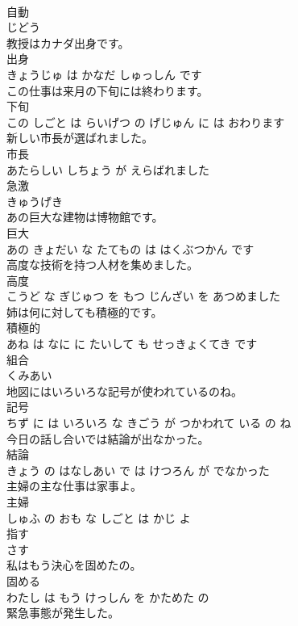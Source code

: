 \documentclass[8pt]{extreport}
\begin{document}
\begin{CJK}{UTF8}{min}
\\	自動	
\\	じどう		
\\	教授はカナダ出身です。	
\\	出身 
\\	きょうじゅ は かなだ しゅっしん です		
\\	この仕事は来月の下旬には終わります。	
\\	下旬 
\\	この しごと は らいげつ の げじゅん に は おわります		
\\	新しい市長が選ばれました。	
\\	市長 
\\	あたらしい しちょう が えらばれました		
\\	急激	
\\	きゅうげき		
\\	あの巨大な建物は博物館です。	
\\	巨大 
\\	あの きょだい な たてもの は はくぶつかん です		
\\	高度な技術を持つ人材を集めました。	
\\	高度 
\\	こうど な ぎじゅつ を もつ じんざい を あつめました		
\\	姉は何に対しても積極的です。	
\\	積極的 
\\	あね は なに に たいして も せっきょくてき です		
\\	組合	
\\	くみあい		
\\	地図にはいろいろな記号が使われているのね。	
\\	記号 
\\	ちず に は いろいろ な きごう が つかわれて いる の ね		
\\	今日の話し合いでは結論が出なかった。	
\\	結論 
\\	きょう の はなしあい で は けつろん が でなかった		
\\	主婦の主な仕事は家事よ。	
\\	主婦 
\\	しゅふ の おも な しごと は かじ よ		
\\	指す	
\\	さす		
\\	私はもう決心を固めたの。	
\\	固める 
\\	わたし は もう けっしん を かためた の		
\\	緊急事態が発生した。	

\end{CJK}
\end{document}
